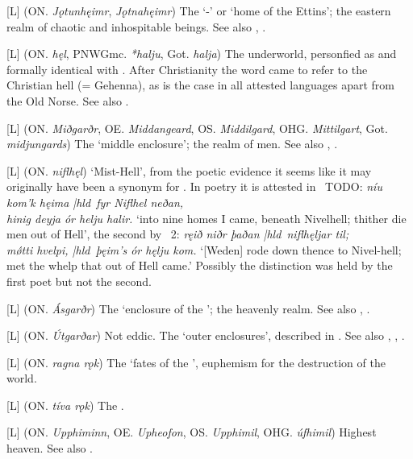 \begin{itemize}

[L] (ON. \emph{Jǫtunhęimr}, \emph{Jǫtnahęimr})
  The ‘-’ or ‘home of the Ettins’; the eastern realm of chaotic and inhospitable beings. See also , .

[L] (ON. \emph{hęl}, PNWGmc. \emph{*halju}, Got. \emph{halja})
  The underworld, personfied as and formally identical with . After Christianity the word came to refer to the Christian hell (= Gehenna), as is the case in all attested languages apart from the Old Norse. See also .

[L] (ON. \emph{Miðgarðr}, OE. \emph{Middangeard}, OS. \emph{Middilgard}, OHG. \emph{Mittilgart}, Got. \emph{midjungards})
  The ‘middle enclosure’; the realm of men. See also , .

[L] (ON. \emph{niflhęl})
  ‘Mist-Hell’, from the poetic evidence it seems like it may originally have been a synonym for . In poetry it is attested in \Vafthrudnismal\ TODO: \emph{níu kom’k hęima |hld\ fyr Niflhel neðan, \\ hinig deyja ór helju halir. } ‘into nine homes I came, beneath Nivelhell; thither die men out of Hell’, the second by \Baldrsdraumar\ 2: \emph{ręið niðr þaðan |hld\ niflhęljar til; \\ mǿtti hvelpi, |hld\ þęim’s ór hęlju kom.} ‘[Weden] rode down thence to Nivel-hell; met the whelp that out of Hell came.’ Possibly the distinction was held by the first poet but not the second.

[L] (ON. \emph{Ásgarðr})
  The ‘enclosure of the ’; the heavenly realm. See also , .

[L] (ON. \emph{Útgarðar})
  Not eddic. The ‘outer enclosures’, described in \Gylfaginning. See also , , .

[L] (ON. \emph{ragna rǫk})
  The ‘fates of the ’, euphemism for the destruction of the world.

[L] (ON. \emph{tíva rǫk})
  The .

[L] (ON. \emph{Upphiminn}, OE. \emph{Upheofon}, OS. \emph{Upphimil}, OHG. \emph{úfhimil})
  Highest heaven. See also .

\end{itemize}

